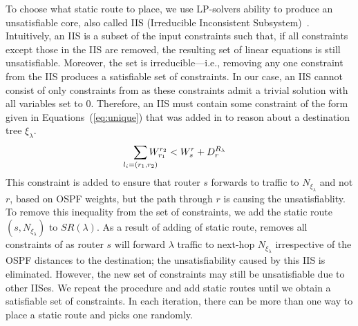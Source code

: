 To choose what static route to place, we use
LP-solvers ability to produce an
unsatisfiable core, also called IIS (Irreducible Inconsistent Subsystem)~\cite{chinneck2007feasibility}. 
Intuitively, an IIS is a subset of the input constraints such that,
if all constraints except those in the IIS are removed, the resulting set of
linear equations is still unsatisfiable. Moreover, the set is irreducible---i.e., removing 
any one constraint from the IIS produces a satisfiable set of constraints. 
In our case, an IIS cannot consist of only 
constraints from  as these constraints
admit a trivial solution with all variables set to 0. 
Therefore, an IIS must contain some constraint of the form
given in  Equations~(\ref{eq:unique})
that was added in to reason about a destination tree $\xi_\lambda$. 
\[
\sum_{\mathclap{\substack{l_i=(r_1,r_2)}}} 
W_{r_1}^{r_2} < W_s^r + D_r^{R_\lambda}  
\]	
This constraint is added to ensure 
that router $s$ forwards to traffic to  
$N_{\xi_\lambda}$ and not $r$, based on OSPF weights,
but the path through $r$ is causing the unsatisfiablity. 
To remove this inequality from the set of constraints, 
we add the static route $(s,N_{\xi_\lambda})$ to $SR(\lambda)$.
As a result of adding of static route, \name removes 
all constraints of  as router $s$ 
will forward $\lambda$ traffic  to 
next-hop $N_{\xi_\lambda}$ irrespective of
the OSPF distances to the destination; the 
unsatisfiability caused by this IIS is eliminated. 
However, the new set of
constraints may still be unsatisfiable due to other IISes.
We repeat the procedure and add static routes
until we obtain a satisfiable set of
constraints. 
In each iteration, there can be more than one way to place a static route and
\name picks one randomly. 

